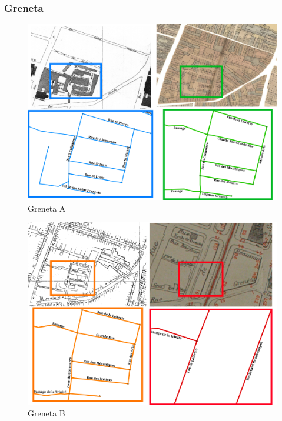 \documentclass[a4paper,12pt]{article}
\begin{document}
\subsubsection{Greneta}

\begin{figure}
\includegraphics[width=1\textwidth]{./images/greneta_A.png}
\caption{Greneta A}
\end{figure}





\begin{figure}
\includegraphics[width=1\textwidth]{./images/greneta_B.png}
\caption{Greneta B}
\end{figure}
\end{document}
